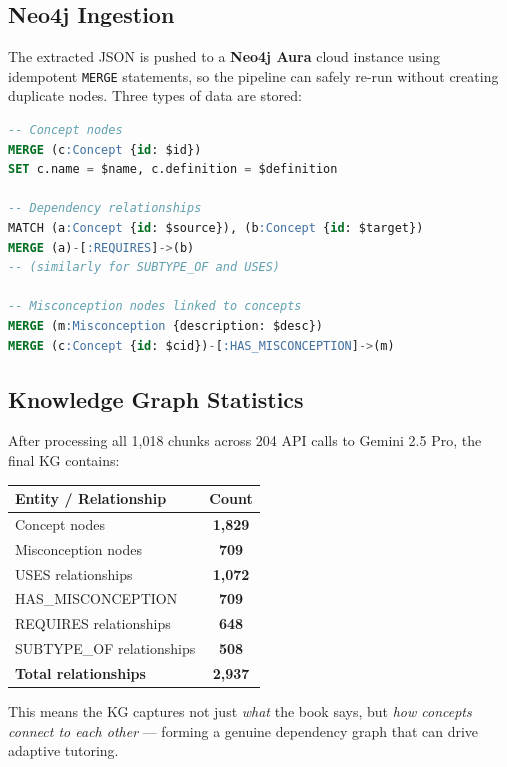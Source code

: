 \documentclass[12pt,a4paper]{article}
\begin{document}
\subsection{Neo4j Ingestion}

The extracted JSON is pushed to a \textbf{Neo4j Aura} cloud instance using
idempotent \texttt{MERGE} statements, so the pipeline can safely re-run without
creating duplicate nodes. Three types of data are stored:

\begin{lstlisting}[language=SQL]
-- Concept nodes
MERGE (c:Concept {id: $id})
SET c.name = $name, c.definition = $definition

-- Dependency relationships
MATCH (a:Concept {id: $source}), (b:Concept {id: $target})
MERGE (a)-[:REQUIRES]->(b)
-- (similarly for SUBTYPE_OF and USES)

-- Misconception nodes linked to concepts
MERGE (m:Misconception {description: $desc})
MERGE (c:Concept {id: $cid})-[:HAS_MISCONCEPTION]->(m)
\end{lstlisting}

\subsection{Knowledge Graph Statistics}

After processing all 1,018 chunks across 204 API calls to Gemini 2.5 Pro, the
final KG contains:

\begin{center}
\begin{tabular}{lc}
  \toprule
  \textbf{Entity / Relationship} & \textbf{Count} \\
  \midrule
  Concept nodes              & \textbf{1,829} \\
  Misconception nodes        & \textbf{709}   \\
  USES relationships         & \textbf{1,072} \\
  HAS\_MISCONCEPTION         & \textbf{709}   \\
  REQUIRES relationships     & \textbf{648}   \\
  SUBTYPE\_OF relationships  & \textbf{508}   \\
  \midrule
  \textbf{Total relationships} & \textbf{2,937} \\
  \bottomrule
\end{tabular}
\end{center}

This means the KG captures not just \textit{what} the book says, but
\textit{how concepts connect to each other} --- forming a genuine dependency
graph that can drive adaptive tutoring.
\end{document}
